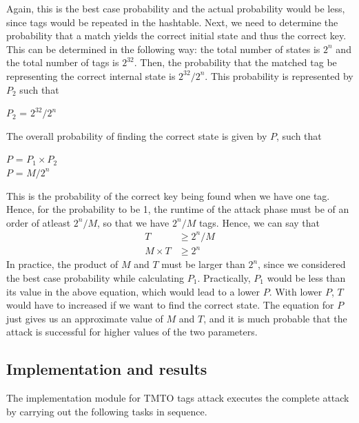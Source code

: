 Again, this is the best case probability and the actual probability would be less, since tags would be repeated in the hashtable. Next, we need to determine the probability that a match yields the correct initial state and thus the correct key. This can be determined in the following way: the total number of states is $2^n$ and the total number of tags is $2^{32}$. Then, the probability that the matched tag be representing the correct internal state is $2^{32}/2^n$. This probability is represented by $P_2$ such that
\begin{center}
$P_2$ = $2^{32}/2^n$
\end{center}
The overall probability of finding the correct state is given by $P$, such that
\begin{center}
$P$ = $P_1 \times P_2$\\
$P$ = $M/2^{n}$\\
\end{center}
This is the probability of the correct key being found when we have one tag. Hence, for the probability to be 1, the runtime of the attack phase must be of an order of atleast $2^{n}/M$, so that we have $2^{n}/M$ tags. Hence, we can say that
\begin{align*}
T &\geq 2^{n}/M\\
M \times T &\geq 2^{n}
\end{align*}
In practice, the product of $M$ and $T$ must be larger than $2^n$, since we considered the best case probability while calculating $P_1$. Practically, $P_1$ would be less than its value in the above equation, which would lead to a lower $P$. With lower $P$, $T$ would have to increased if we want to find the correct state. The equation for $P$ just gives us an approximate value of $M$ and $T$, and it is much probable that the attack is successful for higher values of the two parameters.

\subsection{Implementation and results}

The implementation module for TMTO tags attack executes the complete attack by carrying out the following tasks in sequence. 

